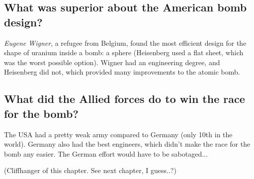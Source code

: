 \subsection*{What was superior about the American bomb design?}
\emph{Eugene Wigner}, a refugee from Belgium, found the most efficient design for the shape of uranium inside a bomb: a sphere (Heisenberg used a flat sheet, which was the worst possible option). Wigner had an engineering degree, and Heisenberg did not, which provided many improvements to the atomic bomb.

\subsection*{What did the Allied forces do to win the race for the bomb?}
The USA had a pretty weak army compared to Germany (only 10th in the world). Germany also had the best engineers, which didn't make the race for the bomb any easier. The German effort would have to be sabotaged...

(Cliffhanger of this chapter. See next chapter, I guess..?)
